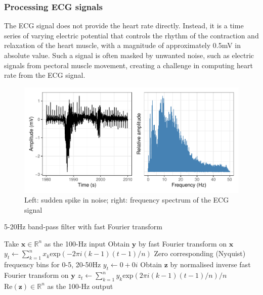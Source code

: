 \documentclass[
]{article}
\begin{document}
\hypertarget{processing-ecg-signals}{%
\subsubsection{Processing ECG signals}\label{processing-ecg-signals}}

The ECG signal does not provide the heart rate directly. Instead, it is
a time series of varying electric potential that controls the rhythm of
the contraction and relaxation of the heart muscle, with a magnitude of
approximately 0.5mV in absolute value. Such a signal is often masked by
unwanted noise, such as electric signals from pectoral muscle movement,
creating a challenge in computing heart rate from the ECG signal.

\begin{figure}

{\centering \includegraphics{report_files/figure-latex/ecg-noise-1} 

}

\caption{Left: sudden spike in noise; right: frequency spectrum of the ECG signal}\label{fig:ecg-noise}
\end{figure}

\begin{algorithm}
\caption{5-20Hz band-pass filter with fast Fourier transform}
\begin{algorithmic}[1]
\STATE Take $\mathbf{x} \in \mathbb{R}^n$ as the 100-Hz input
\STATE Obtain $\mathbf{y}$ by fast Fourier transform on $\mathbf{x}$
\STATE $y_t \leftarrow \sum_{k = 1}^n{x_k}\text{exp}(-2\pi i(k - 1)(t - 1) / n)$
\ENDFOR
\STATE Zero corresponding (Nyquist) frequency bins for 0-5, 20-50Hz
\STATE $y_t \leftarrow 0 + 0i$
\ENDFOR
\STATE Obtain $\mathbf{z}$ by normalised inverse fast Fourier transform on $\mathbf{y}$
\STATE $z_t \leftarrow \sum_{k = 1}^n{y_k}\text{exp}(2\pi i(k - 1)(t - 1) / n) / n$
\ENDFOR
\RETURN $\text{Re}(\mathbf{z}) \in \mathbb{R}^n$ as the 100-Hz output
\end{algorithmic}
\end{algorithm}
\end{document}
